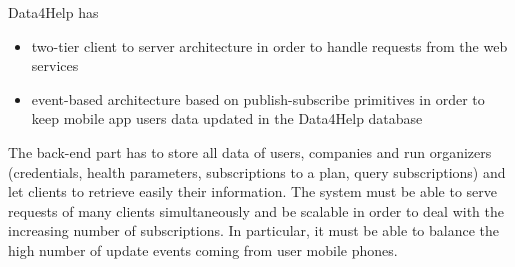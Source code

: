 Data4Help has 
\begin{itemize}
    \item two-tier client to server architecture in order to handle requests from the web services
    \item event-based architecture based on publish-subscribe primitives in order to keep mobile app users data updated in the Data4Help database
\end{itemize}
The back-end part has to store all data of users, companies and run organizers (credentials, health parameters, subscriptions to a plan, query subscriptions) and let clients to retrieve easily their information.
The system must be able to serve requests of many clients simultaneously and be scalable in order to deal with the increasing number of subscriptions. In particular, it must be able to balance the high number of update events coming from user mobile phones.
